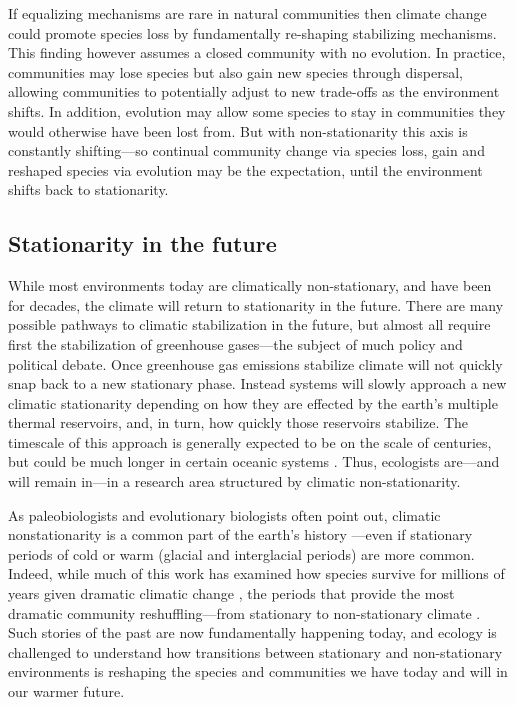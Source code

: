 \documentclass[11pt,letterpaper]{article}
\begin{document}
If equalizing mechanisms are rare in natural communities then climate change could promote species loss by fundamentally re-shaping stabilizing mechanisms. This finding however assumes a closed community with no evolution. In practice, communities may lose species but also gain new species through dispersal, allowing communities to potentially adjust to new trade-offs as the environment shifts. In addition, evolution may allow some species to stay in communities they would otherwise have been lost from. But with non-stationarity this axis is constantly shifting---so continual community change via species loss, gain and reshaped species via evolution may be the expectation, until the environment shifts back to stationarity.

\subsection{Stationarity in the future}

While most environments today are climatically non-stationary, and have been for decades, the climate will return to stationarity in the future. There are many possible pathways to climatic stabilization in the future, but almost all require first the stabilization of greenhouse gases---the subject of much policy and political debate. Once greenhouse gas emissions stabilize climate will not quickly snap back to a new stationary phase. Instead systems will slowly approach a new climatic stationarity depending on how they are effected by the earth's multiple thermal reservoirs, and, in turn, how quickly those reservoirs stabilize. The timescale of this approach is generally expected to be on the scale of centuries, but could be much longer in certain oceanic systems \citep{ipcc2013ch12}. Thus, ecologists are---and will remain in---in a research area structured by climatic non-stationarity. 

As paleobiologists and evolutionary biologists often point out, climatic nonstationarity is a common part of the earth's history \citep{Jansson:2002nz}---even if stationary periods of cold or warm (glacial and interglacial periods) are more common. Indeed, while much of this work has examined how species survive for millions of years given dramatic climatic change \citep{provan2008}, the periods that provide the most dramatic community reshuffling---from stationary to non-stationary climate \citep{vrba1980,vrba1985}. Such stories of the past are now fundamentally happening today, and ecology is challenged to understand how transitions between stationary and non-stationary environments is reshaping the species and communities we have today and will in our warmer future. 
\end{document}
